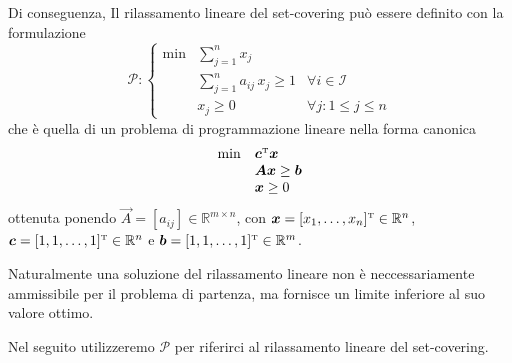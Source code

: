 Di conseguenza, Il rilassamento lineare del set-covering può essere definito con la formulazione
\begin{equation}\label{eq:scplr}
    \mathcal{P}\colon\left\{
    \begin{array}{lll}
        \min & \displaystyle\sum_{j = 1}^n x_j \\[20pt]
             & \displaystyle\sum_{j = 1}^n a_{ij}\,x_j \geq 1 & \forall i \in \mathcal{I} \\[20pt]
             & x_j \geq 0 & \forall j\colon 1 \leq j \leq n
    \end{array}\right.
\end{equation}
che è quella di un problema di programmazione lineare nella forma canonica
\begin{equation}\label{eq:scpcanonical}
    \begin{array}{ll}
        \min & \bm{c}^{\scriptscriptstyle\mathrm{T}}\bm{x}\\
        &\bm{A}\bm{x} \geq \bm{b} \\
        &\bm{x} \geq 0
    \end{array}
\end{equation}
ottenuta ponendo \( \vec{A} = [a_{ij}] \in \mathbb{R}^{m\times n}\), con \( \bm{x} = [x_1, \ldots, x_n]^{\scriptscriptstyle\mathrm{T}} \in
\mathbb{R}^n \), \( \bm{c} = [1, 1, \ldots, 1]^{\scriptscriptstyle\mathrm{T}} \in \mathbb{R}^n \) e \( \bm{b} = [1, 1, \ldots, 1]^{\scriptscriptstyle\mathrm{T}} \in
\mathbb{R}^m \).

Naturalmente una soluzione del rilassamento lineare non è neccessariamente ammissibile per il problema di partenza, ma
fornisce un limite inferiore al suo valore ottimo.

Nel seguito utilizzeremo \( \mathcal{P} \) per riferirci al rilassamento lineare del set-covering.

